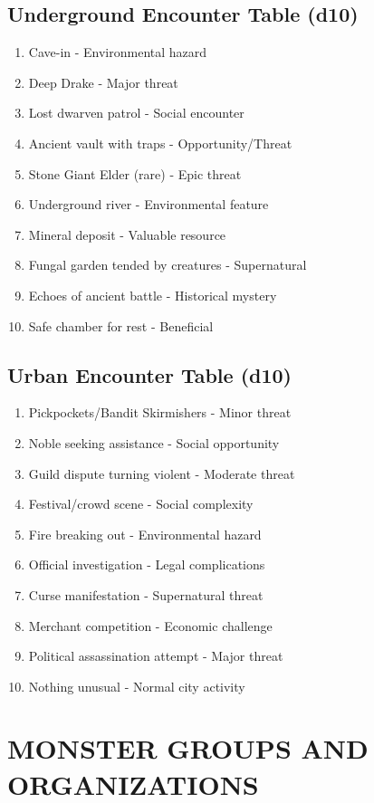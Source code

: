 \documentclass[12pt]{article}
\begin{document}
\begin{itemize}
\subsection*{Underground Encounter Table (d10)}
\begin{enumerate}
\item Cave-in - Environmental hazard
\item Deep Drake - Major threat
\item Lost dwarven patrol - Social encounter
\item Ancient vault with traps - Opportunity/Threat
\item Stone Giant Elder (rare) - Epic threat
\item Underground river - Environmental feature
\item Mineral deposit - Valuable resource
\item Fungal garden tended by creatures - Supernatural
\item Echoes of ancient battle - Historical mystery
\item Safe chamber for rest - Beneficial
\end{enumerate}

\subsection*{Urban Encounter Table (d10)}
\begin{enumerate}
\item Pickpockets/Bandit Skirmishers - Minor threat
\item Noble seeking assistance - Social opportunity
\item Guild dispute turning violent - Moderate threat
\item Festival/crowd scene - Social complexity
\item Fire breaking out - Environmental hazard
\item Official investigation - Legal complications
\item Curse manifestation - Supernatural threat
\item Merchant competition - Economic challenge
\item Political assassination attempt - Major threat
\item Nothing unusual - Normal city activity
\end{enumerate}

\section{MONSTER GROUPS AND ORGANIZATIONS}


\end{itemize}
\end{document}

